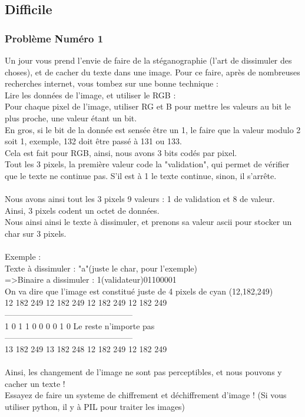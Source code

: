 \documentclass[12pt]{article}
\begin{document}
\subsection{Difficile}

\subsubsection{Problème Numéro 1}

Un jour vous prend l'envie de faire de la stéganographie (l'art de dissimuler des choses), et de cacher du texte dans une image. Pour ce faire, après de nombreuses recherches internet, vous tombez sur une bonne technique :\\
Lire les données de l'image, et utiliser le RGB :\\
Pour chaque pixel de l'image, utiliser RG et B pour mettre les valeurs au bit le plus proche, une valeur étant un bit.\\
En gros, si le bit de la donnée est sensée être un 1, le faire que la valeur modulo 2 soit 1, exemple, 132 doit être passé à 131 ou 133.\\
Cela est fait pour RGB, ainsi, nous avons 3 bits codés par pixel.\\
Tout les 3 pixels, la première valeur code la "validation", qui permet de vérifier que le texte ne continue pas. S'il est à 1 le texte continue, sinon, il s'arrête.
\\\\
Nous avons ainsi tout les 3 pixels 9 valeurs : 1 de validation et 8 de valeur.\\
Ainsi, 3 pixels codent un octet de données.\\
Nous ainsi ainsi le texte à dissimuler, et prenons sa valeur ascii pour stocker un char sur 3 pixels.
\\\\
Exemple :\\
Texte à dissimuler : "a"(juste le char, pour l'exemple)\\
=\textgreater Binaire a dissimuler : 1(validateur)01100001\\
On va dire que l'image est constitué juste de 4 pixels de cyan (12,182,249)\\
12  182 249 12  182 249 12  182 249 12  182 249\\
-----------------------------------------------\\
1   0   1   1   0   0   0   0   1   0   Le reste n'importe pas\\
-----------------------------------------------\\
13  182 249 13  182 248 12  182 249 12  182 249
\\\\
Ainsi, les changement de l'image ne sont pas perceptibles, et nous pouvons y cacher un texte !\\
Essayez de faire un systeme de chiffrement et déchiffrement d'image ! (Si vous utiliser python, il y à PIL pour traiter les images)\\
\end{document}
